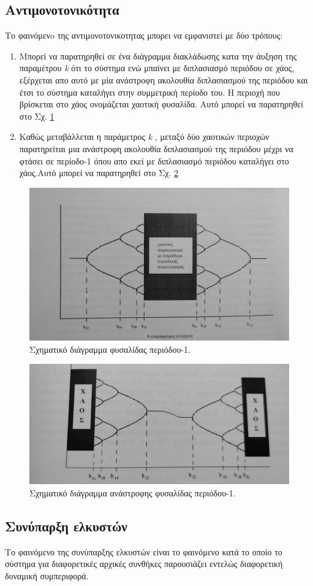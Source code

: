 \subsection{Aντιμονοτονικότητα}
Το φαινόμενo της αντιμονοτονικοτητας μπορει να εμφανιστεί με δύο τρόπους:
\begin{enumerate}
	
	\item Μπορεί να παρατηρηθεί σε ένα διάγραμμα διακλάδωσης κατα την άυξηση της παραμέτρου \emph{k} ότι το σύστημα ενώ μπαίνει με διπλασιασμό περιόδου σε χάος, εξέρχεται απο αυτό με μία ανάστροφη ακολουθία διπλασιασμού της περιόδου και έτσι το σύστημα καταλήγει στην συμμετρική περίοδο του. Η περιοχή που βρίσκεται στο χάος ονομάζεται χαοτική φυσαλίδα. Αυτό μπορεί να παρατηρηθεί στο Σχ. \ref{th:g3}
	
	\item  Καθώς μεταβάλλεται η παράμετρος \emph{k} , μεταξύ δύο χαοτικών περιοχών παρατηρείται μια ανάστροφη ακολουθία διπλασιασμού της περιόδου μέχρι να φτάσει σε περίοδο-1 όπου απο εκεί με διπλασιασμό περιόδου καταλήγει στο χάος.Αυτό μπορεί να παρατηρηθεί στο Σχ. \ref{th:g4}
	
\end{enumerate}
\begin{figure}[ht]
	\centering
	\includegraphics[width=1\linewidth]{LateX images/antimon1}
	\caption{ Σχηματικό διάγραμμα φυσαλίδας περιόδου-1.}
	\label{th:g3}	
\end{figure}

\begin{figure}[ht]
	\centering
	\includegraphics[width=1\linewidth]{LateX images/antimon2}
	\caption{ Σχηματικό διάγραμμα ανάστροφης φυσαλίδας περιόδου-1.}
	\label{th:g4}	
\end{figure}
\subsection{Συνύπαρξη ελκυστών}
Το φαινόμενο της συνύπαρξης ελκυστών είναι το φαινόμενο κατά το οποίο το σύστημα για διαφορετικές αρχικές συνθήκες παρουσιάζει εντελώς διαφορετική δυναμική συμπεριφορά.

\clearpage
